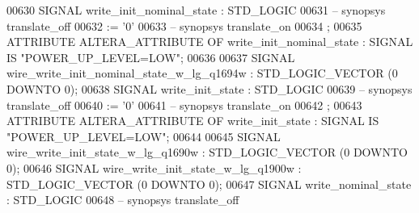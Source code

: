 \begin{DoxyCode}
{00630      \textcolor{keywordflow}{SIGNAL}  \textcolor{vhdlchar}{write_init_nominal_state}   \textcolor{vhdlchar}{:}   \textcolor{comment}{STD\_LOGIC}
00631 \textcolor{keyword}{     -- synopsys translate\_off}
00632       \textcolor{vhdlchar}{:=} \textcolor{vhdlchar}{'}\textcolor{vhdllogic}{}\textcolor{vhdllogic}{0}\textcolor{vhdlchar}{'}
00633 \textcolor{keyword}{     -- synopsys translate\_on}
00634      ;
00635      \textcolor{keywordflow}{ATTRIBUTE} \textcolor{vhdlchar}{ALTERA_ATTRIBUTE} \textcolor{keywordflow}{OF} \textcolor{vhdlchar}{write_init_nominal_state} \textcolor{vhdlchar}{:} \textcolor{keywordflow}{SIGNAL} \textcolor{keywordflow}{IS} \textcolor{keyword}{"POWER\_UP\_LEVEL=LOW"};
00636 
00637      \textcolor{keywordflow}{SIGNAL}  \textcolor{vhdlchar}{wire_write_init_nominal_state_w_lg_q1694w}  \textcolor{vhdlchar}{:}   \textcolor{comment}{STD\_LOGIC\_VECTOR} \textcolor{vhdlchar}{(}\textcolor{vhdllogic}{}\textcolor{vhdllogic}{0} \textcolor{keywordflow}{DOWNTO} \textcolor{vhdllogic}{}\textcolor{vhdllogic}{0}\textcolor{vhdlchar}{)};
00638      \textcolor{keywordflow}{SIGNAL}  \textcolor{vhdlchar}{write_init_state}   \textcolor{vhdlchar}{:}   \textcolor{comment}{STD\_LOGIC}
00639 \textcolor{keyword}{     -- synopsys translate\_off}
00640       \textcolor{vhdlchar}{:=} \textcolor{vhdlchar}{'}\textcolor{vhdllogic}{}\textcolor{vhdllogic}{0}\textcolor{vhdlchar}{'}
00641 \textcolor{keyword}{     -- synopsys translate\_on}
00642      ;
00643      \textcolor{keywordflow}{ATTRIBUTE} \textcolor{vhdlchar}{ALTERA_ATTRIBUTE} \textcolor{keywordflow}{OF} \textcolor{vhdlchar}{write_init_state} \textcolor{vhdlchar}{:} \textcolor{keywordflow}{SIGNAL} \textcolor{keywordflow}{IS} \textcolor{keyword}{"POWER\_UP\_LEVEL=LOW"};
00644 
00645      \textcolor{keywordflow}{SIGNAL}  \textcolor{vhdlchar}{wire_write_init_state_w_lg_q1690w}  \textcolor{vhdlchar}{:}   \textcolor{comment}{STD\_LOGIC\_VECTOR} \textcolor{vhdlchar}{(}\textcolor{vhdllogic}{}\textcolor{vhdllogic}{0} \textcolor{keywordflow}{DOWNTO} \textcolor{vhdllogic}{}\textcolor{vhdllogic}{0}\textcolor{vhdlchar}{)};
00646      \textcolor{keywordflow}{SIGNAL}  \textcolor{vhdlchar}{wire_write_init_state_w_lg_q1900w}  \textcolor{vhdlchar}{:}   \textcolor{comment}{STD\_LOGIC\_VECTOR} \textcolor{vhdlchar}{(}\textcolor{vhdllogic}{}\textcolor{vhdllogic}{0} \textcolor{keywordflow}{DOWNTO} \textcolor{vhdllogic}{}\textcolor{vhdllogic}{0}\textcolor{vhdlchar}{)};
00647      \textcolor{keywordflow}{SIGNAL}  \textcolor{vhdlchar}{write_nominal_state}    \textcolor{vhdlchar}{:}   \textcolor{comment}{STD\_LOGIC}
00648 \textcolor{keyword}{     -- synopsys translate\_off}
}
\end{DoxyCode}
